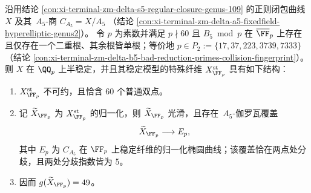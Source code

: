 \begin{theorem}\label{thm:xi-terminal-zm-delta-s5-tame-collision-semistable-fiber}
沿用结论 \ref{con:xi-terminal-zm-delta-s5-regular-closure-genus-109} 的正则闭包曲线 \(X\) 及其 \(\,A_5\)-商
\(
C_{A_5}=X/A_5
\)
（结论 \ref{con:xi-terminal-zm-delta-a5-fixedfield-hyperelliptic-genus2}）。
令 \(p\) 为素数并满足 \(p\nmid 60\) 且 \(B_5\bmod p\) 在 \(\overline{\FF}_p\) 上存在且仅存在一个二重根、其余根皆单根；等价地 \(p\in P_2:=\{17,37,223,3739,7333\}\)（结论 \ref{con:xi-terminal-zm-delta-b5-bad-reduction-primes-collision-fingerprint}）。
则 \(X\) 在 \(\QQ_p\) 上半稳定，并且其稳定模型的特殊纤维 \(X^{\mathrm{st}}_{\FF_p}\) 具有如下结构：
\begin{enumerate}
  \item \(X^{\mathrm{st}}_{\FF_p}\) 不可约，且恰含 \(60\) 个普通双点。
  \item 记 \(\widetilde X_{\FF_p}\) 为 \(X^{\mathrm{st}}_{\FF_p}\) 的归一化，则 \(\widetilde X_{\FF_p}\) 光滑，且存在 \(\,A_5\)-伽罗瓦覆盖
  \[
  \widetilde X_{\FF_p}\longrightarrow E_p,
  \]
  其中 \(E_p\) 为 \(C_{A_5}\) 在 \(\FF_p\) 上稳定纤维的归一化椭圆曲线；该覆盖恰在两点处分歧，且两处分歧指数皆为 \(5\)。
  \item 因而 \(g(\widetilde X_{\FF_p})=49\)。
\end{enumerate}
\end{theorem}
